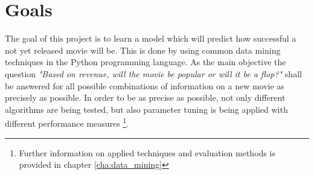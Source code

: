 \section{Goals}
The goal of this project is to learn a model which will predict how successful a not yet released movie will be. This is done by using common data mining techniques in the Python programming language. As the main objective the question \textit{"Based on revenue, will the movie be popular or will it be a flop?"} shall be answered for all possible combinations of information on a new movie as precisely as possible.
In order to be as precise as possible, not only different algorithms are being tested, but also parameter tuning is being applied with different performance measures \footnote{Further information on applied techniques and evaluation methods is provided in chapter \ref{cha:data_mining}}.








 